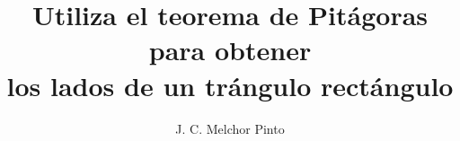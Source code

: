 \documentclass[12pt]{guia}
\title{Utiliza el teorema de Pitágoras para obtener \\ los lados de un trángulo rectángulo}
\author{J. C. Melchor Pinto}
\begin{document}
\pagestyle{headandfoot}
\addpoints
\INFO
\printanswers

\begin{multicols}{2}
    
    
\end{multicols}
\begin{questions}
    \questionboxed[10] {}
    \questionboxed[10] {}
    \questionboxed[10] {}
    \questionboxed[10] {}
    \questionboxed[10] {}
    \questionboxed[10] {}
    \questionboxed[10] {}
    \questionboxed[10] {}
    \questionboxed[10] {}
    \questionboxed[10] {}
\end{questions}
\end{document}
